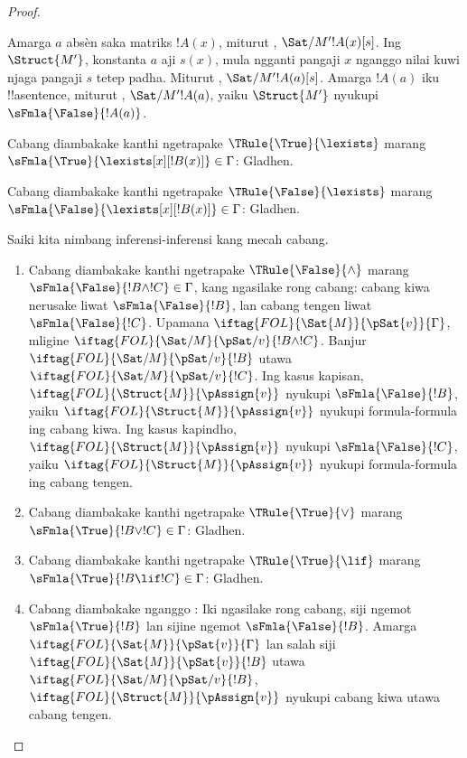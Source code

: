 \documentclass[../../../include/open-logic-section]{subfiles}
\begin{document}
\begin{proof}
\begin{enumerate}
{  Amarga $a$ absèn saka matriks $!A(x)$, miturut
  , $\Sat/{M'}{!A(x)}[s]$.
  Ing $\Struct{M'}$, konstanta $a$ aji $s(x)$, mula ngganti pangaji
  $x$ nganggo nilai kuwi njaga pangaji $s$ tetep padha. Miturut
  , $\Sat/{M'}{!A(a)}[s]$. Amarga
  $!A(a)$ iku !!a{sentence}, miturut
  , $\Sat/{M'}{!A(a)}$, yaiku
  $\Struct{M'}$ nyukupi $\sFmla{\False}{!A(a)}$.
\item Cabang diambakake kanthi ngetrapake $\TRule{\True}{\lexists}$
  marang $\sFmla{\True}{\lexists[x][!B(x)]} \in \Gamma$: Gladhen.
\item Cabang diambakake kanthi ngetrapake $\TRule{\False}{\lexists}$
  marang $\sFmla{\False}{\lexists[x][!B(x)]} \in \Gamma$: Gladhen.}{}
\end{enumerate}
Saiki kita nimbang inferensi-inferensi kang mecah cabang.
\begin{enumerate}
\item Cabang diambakake kanthi ngetrapake $\TRule{\False}{\land}$
  marang $\sFmla{\False}{!B \land !C} \in \Gamma$, kang ngasilake
  rong cabang: cabang kiwa nerusake liwat $\sFmla{\False}{!B}$, lan
  cabang tengen liwat $\sFmla{\False}{!C}$. Upamana
  $\iftag{FOL}{\Sat{M}}{\pSat{v}}{\Gamma}$, mligine
  $\iftag{FOL}{\Sat/{M}}{\pSat/{v}}{!B \land !C}$. Banjur
  $\iftag{FOL}{\Sat/{M}}{\pSat/{v}}{!B}$ utawa
  $\iftag{FOL}{\Sat/{M}}{\pSat/{v}}{!C}$. Ing kasus kapisan,
  $\iftag{FOL}{\Struct{M}}{\pAssign{v}}$ nyukupi
  $\sFmla{\False}{!B}$, yaiku $\iftag{FOL}{\Struct{M}}{\pAssign{v}}$
  nyukupi formula-formula ing cabang kiwa. Ing kasus kapindho,
  $\iftag{FOL}{\Struct{M}}{\pAssign{v}}$ nyukupi
  $\sFmla{\False}{!C}$, yaiku $\iftag{FOL}{\Struct{M}}{\pAssign{v}}$
  nyukupi formula-formula ing cabang tengen.
\item Cabang diambakake kanthi ngetrapake $\TRule{\True}{\lor}$
  marang $\sFmla{\True}{!B \lor !C} \in \Gamma$: Gladhen.
\item Cabang diambakake kanthi ngetrapake $\TRule{\True}{\lif}$
  marang $\sFmla{\True}{!B \lif !C} \in \Gamma$: Gladhen.
\item Cabang diambakake nganggo \Cut: Iki ngasilake rong cabang,
  siji ngemot $\sFmla{\True}{!B}$ lan sijine ngemot
  $\sFmla{\False}{!B}$. Amarga
  $\iftag{FOL}{\Sat{M}}{\pSat{v}}{\Gamma}$ lan salah siji
  $\iftag{FOL}{\Sat{M}}{\pSat{v}}{!B}$ utawa
  $\iftag{FOL}{\Sat/{M}}{\pSat/{v}}{!B}$,
  $\iftag{FOL}{\Struct{M}}{\pAssign{v}}$ nyukupi cabang kiwa utawa
  cabang tengen.
\end{enumerate}
\end{proof}
\end{document}

